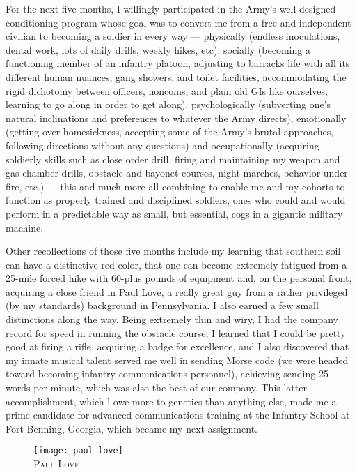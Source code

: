 \documentclass[../m3y]{subfiles}
\begin{document}
For the next five months, I willingly participated in the Army's well-designed conditioning program whose goal was to convert me from a free and independent civilian to becoming a soldier in every way --- physically (endless inoculations, dental work, lots of daily drills, weekly hikes, etc), socially (becoming a functioning member of an infantry platoon, adjusting to barracks life with all its different human nuances, gang showers, and toilet facilities, accommodating the rigid dichotomy between officers, noncoms, and plain old GIs like ourselves, learning to go along in order to get along), psychologically (subverting one's natural inclinations and preferences to whatever the Army directs), emotionally (getting over homesickness, accepting some of the Army's brutal approaches, following directions without any questions) and occupationally (acquiring soldierly skills such as close order drill, firing and maintaining my weapon and gas chamber drills, obstacle and bayonet courses, night marches, behavior under fire, etc.) --- this and much more all combining to enable me and my cohorts to function as properly trained and disciplined soldiers, ones who could and would perform in a predictable way as small, but essential, cogs in a gigantic military machine.

Other recollections of those five months include my learning that southern soil can have a distinctive red color, that one can become extremely fatigued from a 25-mile forced hike with 60-plus pounds of equipment and, on the personal front, acquiring a close friend in Paul Love, a really great guy from a rather privileged (by my standards) background in Pennsylvania. I also earned a few small distinctions along the way. Being extremely thin and wiry, I had the company record for speed in running the obstacle course, I learned that I could be pretty good at firing a rifle, acquiring a badge for excellence, and I also discovered that my innate musical talent served me well in sending Morse code (we were headed toward becoming infantry communications personnel), achieving sending 25 words per minute, which was also the best of our company. This latter accomplishment, which l owe more to genetics than anything else, made me a prime candidate for advanced communications training at the Infantry School at Fort Benning, Georgia, which became my next assignment.

\begin{figure}
\centering
\texttt{[image: paul-love]}\\
\medskip
{\newtimes\textsc{Paul Love}}
\end{figure}
\end{document}
